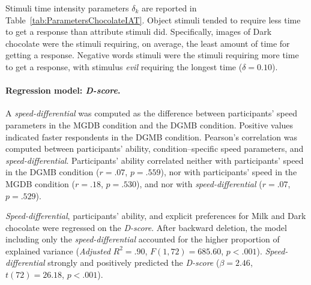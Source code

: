 \documentclass[12pt]{book}
\begin{document}

Stimuli time intensity parameters $\delta_k$ are reported in Table~\ref{tab:ParametersChocolateIAT}.     
Object stimuli tended to require less time to get a response than attribute stimuli did. Specifically, images of Dark chocolate were the stimuli requiring, on average, the least amount of time for getting a response. Negative words stimuli were the stimuli requiring more time to get a response, with stimulus \emph{evil} requiring the longest time ($\delta = 0.10$).


\paragraph{Regression model: \emph{D-score}.}
A \emph{speed-differential} was computed as the difference between participants' speed parameters in the MGDB condition and the DGMB condition. Positive values indicated faster respondents in the DGMB condition. Pearson's correlation was computed between participants' ability, condition--specific speed parameters, and \emph{speed-differential}.
Participants' ability correlated neither with participants' speed in the DGMB condition ($r = .07$, $p = .559$), nor with participants' speed in the MGDB condition ($r = .18$, $p = .530$), and nor with \emph{speed-differential} ($r = .07$, $p = .529$). 

\emph{Speed-differential}, participants' ability, and explicit preferences for Milk and Dark chocolate were regressed on the \emph{D-score}. 
After backward deletion, the model including only the \emph{speed-differential} accounted for the higher proportion of explained variance (\emph{Adjusted} $R^2 = .90$, $F(1, 72) = 685.60$, $p < .001$). \emph{Speed-differential} strongly and positively predicted the \emph{D-score} ($\beta = 2.46$, $t(72) = 26.18$, $p < .001$).
\end{document}
